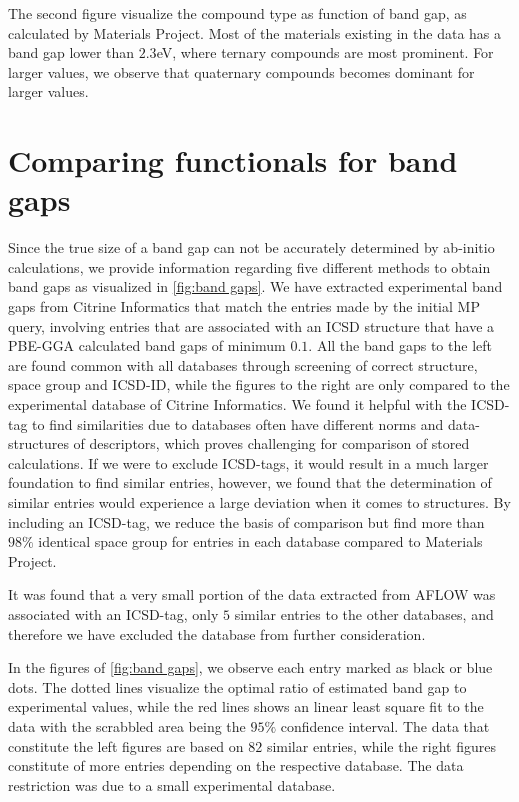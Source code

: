 \clearpage

\noindent The second figure visualize the compound type as function of band gap, as calculated by Materials Project. Most of the materials existing in the data has a band gap lower than $2.3$eV, where ternary compounds are most prominent. For larger values, we observe that quaternary compounds becomes dominant for larger values.

\section{Comparing functionals for band gaps}

Since the true size of a band gap can not be accurately determined by ab-initio calculations, we provide information regarding five different methods to obtain band gaps as visualized in \autoref{fig:band gaps}. We have extracted experimental band gaps from Citrine Informatics that match the entries made by the initial MP query, involving entries that are associated with an ICSD structure that have a PBE-GGA calculated band gaps of minimum $0.1$. All the band gaps to the left are found common with all databases through screening of correct structure, space group and ICSD-ID, while the figures to the right are only compared to the experimental database of Citrine Informatics. We found it helpful with the ICSD-tag to find similarities due to databases often have different norms and data-structures of descriptors, which proves challenging for comparison of stored calculations. If we were to exclude ICSD-tags, it would result in a much larger foundation to find similar entries, however, we found that the determination of similar entries would experience a large deviation when it comes to structures. By including an ICSD-tag, we reduce the basis of comparison but find more than $98\%$ identical space group for entries in each database compared to Materials Project.

It was found that a very small portion of the data extracted from AFLOW was associated with an ICSD-tag, only $5$ similar entries to the other databases, and therefore we have excluded the database from further consideration.

In the figures of \autoref{fig:band gaps}, we observe each entry marked as black or blue dots. The dotted lines visualize the optimal ratio of estimated band gap to experimental values, while the red lines shows an linear least square fit to the data with the scrabbled area being the $95\%$ confidence interval. The data that constitute the left figures are based on $82$ similar entries, while the right figures constitute of more entries depending on the respective database. The data restriction was due to a small experimental database.

